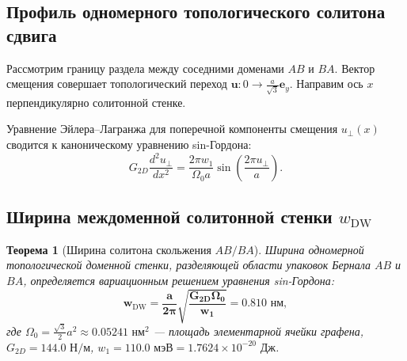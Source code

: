 \documentclass[12pt,a4paper]{article}
\newtheorem{theorem}{Теорема}
\begin{document}
\subsection{Профиль одномерного топологического солитона сдвига}
Рассмотрим границу раздела между соседними доменами $AB$ и $BA$. Вектор смещения совершает топологический переход $\mathbf{u}: 0 \to \frac{a}{\sqrt{3}} \mathbf{e}_y$. Направим ось $x$ перпендикулярно солитонной стенке.

Уравнение Эйлера--Лагранжа для поперечной компоненты смещения $u_\perp(x)$ сводится к каноническому уравнению sin-Гордона:
\begin{equation}
	G_{2D} \frac{d^2 u_\perp}{dx^2} = \frac{2\pi w_1}{\Omega_0 a} \sin\left( \frac{2\pi u_\perp}{a} \right).
\end{equation}

\subsection{Ширина междоменной солитонной стенки $w_{\text{DW}}$}
\begin{theorem}[Ширина солитона скольжения $AB/BA$]
	Ширина одномерной топологической доменной стенки, разделяющей области упаковок Бернала $AB$ и $BA$, определяется вариационным решением уравнения sin-Гордона:
	\begin{equation}
		\mathbf{w_{\mathrm{DW}} = \frac{a}{2\pi} \sqrt{\frac{G_{2D} \Omega_0}{w_1}} = \mathbf{0.810\text{ нм}}},
	\end{equation}
	где $\Omega_0 = \frac{\sqrt{3}}{2} a^2 \approx 0.05241\text{ нм}^2$ — площадь элементарной ячейки графена, $G_{2D} = 144.0\text{ Н/м}$, $w_1 = 110.0\text{ мэВ} = 1.7624 \times 10^{-20}\text{ Дж}$.
\end{theorem}
\end{document}
